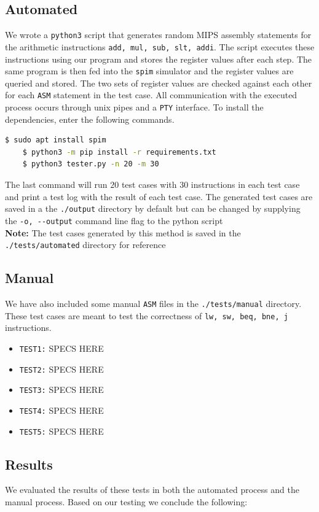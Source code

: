 \documentclass[hidelinks,12pt]{article}
\begin{document}
\subsection{Automated}
We wrote a \verb|python3| script that generates random MIPS assembly statements for the arithmetic instructions \verb|add, mul, sub, slt, addi|.
The script executes these instructions using our program and stores the register values after each step. The same program is then fed into the \verb|spim| simulator and
the register values are queried and stored. The two sets of register values are checked against each other for each \verb|ASM| statement in the test case.
All communication with the executed process occurs through unix pipes and a \verb|PTY| interface.
To install the dependencies, enter the following commands. \\[0.1cm]
\begin{lstlisting}[language=bash]
    $ sudo apt install spim
    $ python3 -m pip install -r requirements.txt
    $ python3 tester.py -n 20 -m 30 
\end{lstlisting}
The last command will run $20$ test cases with $30$ instructions in each test case and print a test log with the result of each test case.
The generated test cases are saved in a the \verb|./output| directory by default but can be changed by supplying the \verb|-o, --output| command line flag to the python script\\

\textbf{Note:} The test cases generated by this method is saved in the \verb|./tests/automated| directory for reference

\subsection{Manual}
We have also included some manual \verb|ASM| files in the \verb|./tests/manual| directory. These test cases are meant to test the correctness of \verb|lw, sw, beq, bne, j| instructions.
\begin{itemize}
    \item \verb|TEST1:| SPECS HERE
    \item \verb|TEST2:| SPECS HERE
    \item \verb|TEST3:| SPECS HERE
    \item \verb|TEST4:| SPECS HERE
    \item \verb|TEST5:| SPECS HERE
\end{itemize}
\subsection{Results}
We evaluated the results of these tests in both the automated process and the manual process. Based on our testing we conclude the following:
\end{document}
